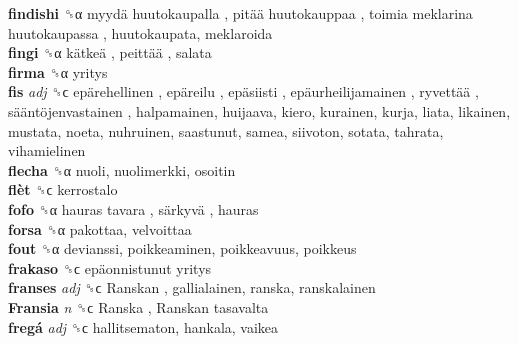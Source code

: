 \textbf{findishi} ␝α   myydä huutokaupalla ,  pitää huutokauppaa ,  toimia meklarina huutokaupassa , huutokaupata, meklaroida  \\
\textbf{fingi} ␝α   kätkeä ,  peittää , salata  \\
\textbf{firma} ␝α  yritys  \\
\textbf{fis} \emph{adj}  ␝ϲ   epärehellinen ,  epäreilu ,  epäsiisti ,  epäurheilijamainen ,  ryvettää ,  sääntöjenvastainen , halpamainen, huijaava, kiero, kurainen, kurja, liata, likainen, mustata, noeta, nuhruinen, saastunut, samea, siivoton, sotata, tahrata, vihamielinen  \\
\textbf{flecha} ␝α  nuoli, nuolimerkki, osoitin  \\
\textbf{flèt} ␝ϲ  kerrostalo  \\
\textbf{fofo} ␝α   hauras tavara ,  särkyvä , hauras  \\
\textbf{forsa} ␝α  pakottaa, velvoittaa  \\
\textbf{fout} ␝α  devianssi, poikkeaminen, poikkeavuus, poikkeus  \\
\textbf{frakaso} ␝ϲ   epäonnistunut yritys   \\
\textbf{franses} \emph{adj}  ␝ϲ   Ranskan , gallialainen, ranska, ranskalainen  \\
\textbf{Fransia} \emph{n}  ␝ϲ   Ranska ,  Ranskan tasavalta   \\
\textbf{fregá} \emph{adj}  ␝ϲ  hallitsematon, hankala, vaikea  \\
